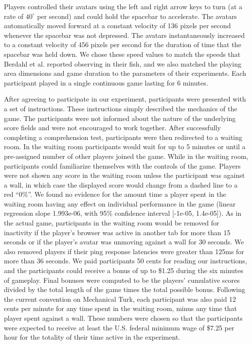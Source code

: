 \documentclass[12pt,letterpaper]{article}
\begin{document}
Players controlled their avatars using the left and right arrow keys
to turn (at a rate of $40^\circ$ per second) and could hold the
spacebar to accelerate.  The avatars automatically moved forward at a
constant velocity of 136 pixels per second whenever the spacebar was
not depressed.  The avatars instantaneously increased to a constant
velocity of 456 pixels per second for the duration of time that the
spacebar was held down.  We chose these speed values to match the
speeds that Berdahl et al. reported observing in their fish, and we
also matched the playing area dimensions and game duration to the
parameters of their experiments.  Each participant played in a single
continuous game lasting for 6 minutes.


After agreeing to participate in our experiment, participants were
presented with a set of instructions.  These instructions simply
described the mechanics of the game.  The participants were not
informed about the nature of the underlying score fields and were not
encouraged to work together.  After successfully completing a
comprehension test, participants were then redirected to a waiting
room.  In the waiting room participants would wait for up to 5 minutes
or until a pre-assigned number of other players joined the game.
While in the waiting room, participants could familiarize themselves
with the controls of the game.  Players were not shown any score in
the waiting room unless the participant was against a wall, in which
case the displayed score would change from a dashed line to a red
``0\%''.  We found no evidence for the amount time a player spent in
the waiting room having any effect on individual performance in the
game (linear regression slope 1.993e-06, with 95\% confidence interval
[-1e-05, 1.4e-05]).  As in the actual game, participants in the
waiting room would be removed for inactivity if the player's browser
was active in another tab for more than 15 seconds or if the player's
avatar was unmoving against a wall for 30 seconds.  We also removed
players if their ping response latencies were greater than 125ms for
more than 36 seconds.  We paid participants 50 cents for reading our
instructions, and the participants could receive a bonus of up to
\$1.25 during the six minutes of gameplay. Final bonuses were computed
to be the players' cumulative scores divided by the total length of
the game times the total possible bonus.  Following the current
convention on Mechanical Turk, each participant was also paid 12 cents
per minute for any time spent in the waiting room, minus any time that
player spent against a wall.  These numbers were chosen so that the
participants were expected to receive at least the U.S. federal minimum
wage of \$7.25 per hour for the totality of their time active in the
experiment.
\end{document}
